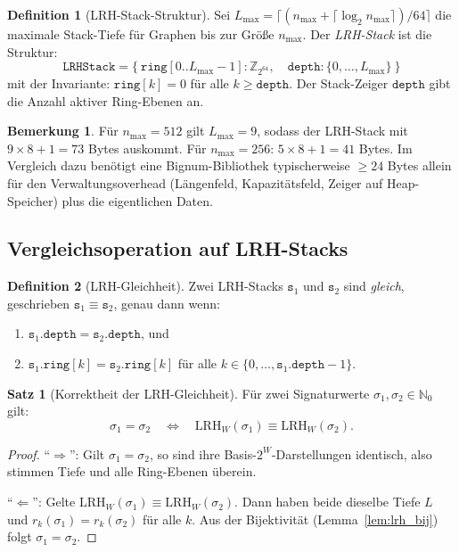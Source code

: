 ﻿\documentclass[a4paper,12pt]{article}
\theoremstyle{definition}
\newtheorem{definition}{Definition}
\newtheorem{satz}{Satz}
\newtheorem{bemerkung}{Bemerkung}
\begin{document}
\begin{definition}[LRH-Stack-Struktur]
\label{def:lrh_stack}
Sei $L_{\max} = \lceil (n_{\max} + \lceil \log_2 n_{\max} \rceil) / 64 \rceil$
die maximale Stack-Tiefe für Graphen bis zur Größe $n_{\max}$.
Der \emph{LRH-Stack} ist die Struktur:
\[
  \mathtt{LRHStack} = \{\ \mathtt{ring}[0..L_{\max}-1] : \mathbb{Z}_{2^{64}},\quad
                          \mathtt{depth} : \{0,\ldots,L_{\max}\}\ \}
\]
mit der Invariante: $\mathtt{ring}[k] = 0$ für alle $k \geq \mathtt{depth}$.
Der Stack-Zeiger $\mathtt{depth}$ gibt die Anzahl aktiver Ring-Ebenen an.
\end{definition}

\begin{bemerkung}
Für $n_{\max} = 512$ gilt $L_{\max} = 9$, sodass der LRH-Stack mit
$9 \times 8 + 1 = 73$ Bytes auskommt. Für $n_{\max} = 256$: $5 \times 8 + 1 = 41$ Bytes.
Im Vergleich dazu benötigt eine Bignum-Bibliothek typischerweise $\geq 24$ Bytes
allein für den Verwaltungsoverhead (Längenfeld, Kapazitätsfeld, Zeiger auf Heap-Speicher)
plus die eigentlichen Daten.
\end{bemerkung}

\subsection{Vergleichsoperation auf LRH-Stacks}

\begin{definition}[LRH-Gleichheit]
\label{def:lrh_eq}
Zwei LRH-Stacks $\mathtt{s}_1$ und $\mathtt{s}_2$ sind \emph{gleich}, geschrieben
$\mathtt{s}_1 \equiv \mathtt{s}_2$, genau dann wenn:
\begin{enumerate}
  \item $\mathtt{s}_1.\mathtt{depth} = \mathtt{s}_2.\mathtt{depth}$, und
  \item $\mathtt{s}_1.\mathtt{ring}[k] = \mathtt{s}_2.\mathtt{ring}[k]$ für alle
        $k \in \{0,\ldots,\mathtt{s}_1.\mathtt{depth}-1\}$.
\end{enumerate}
\end{definition}

\begin{satz}[Korrektheit der LRH-Gleichheit]
\label{satz:lrh_eq_korrekt}
Für zwei Signaturwerte $\sigma_1, \sigma_2 \in \mathbb{N}_0$ gilt:
\[
  \sigma_1 = \sigma_2 \quad \Longleftrightarrow \quad
  \mathrm{LRH}_W(\sigma_1) \equiv \mathrm{LRH}_W(\sigma_2).
\]
\end{satz}

\begin{proof}
``$\Rightarrow$'': Gilt $\sigma_1 = \sigma_2$, so sind ihre Basis-$2^W$-Darstellungen
identisch, also stimmen Tiefe und alle Ring-Ebenen überein.

``$\Leftarrow$'': Gelte $\mathrm{LRH}_W(\sigma_1) \equiv \mathrm{LRH}_W(\sigma_2)$.
Dann haben beide dieselbe Tiefe $L$ und $r_k(\sigma_1) = r_k(\sigma_2)$ für alle $k$.
Aus der Bijektivität (Lemma~\ref{lem:lrh_bij}) folgt $\sigma_1 = \sigma_2$.
\end{proof}
\end{document}
